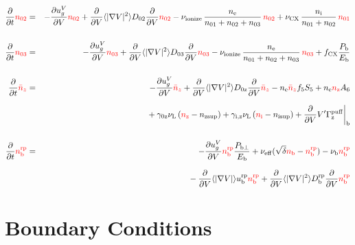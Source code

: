 \documentclass[11pt]{article}
\def\r#1{{\rm#1}}
\def\aves#1{\langle#1\rangle}
\def\dd#1#2{\frac{\partial #1}{\partial #2}}
\def\ddV{\frac{\partial}{\partial V}}
\def\ddt{\frac{\partial}{\partial t}}
\def\nee{n_\r{e}}
\def\ni{n_\r{i}}
\def\nz{n_\r{z}}
\def\nb{n_\r{b}}
\def\ugV{u_{g}^V}
\def\nsup#1{n_\r{#1sup}}
\def\nbrp{n_\r{b}^\r{rp}}
\def\ubrp{u_\r{b}^\r{rp}}
\def\Dbrp{D_\r{b}^\r{rp}}
\def\Pbperp{P_{\r{b}\perp}}
\def\Pb{P_\r{b}}
\def\Eb{E_\r{b}}
\def\nna{n_{01}}
\def\nnb{n_{02}}
\def\nnc{n_{03}}
\def\nnz{\bar{n}_{z}}
\def\nueff{\nu_\r{eff}}
\def\fCX{f_\r{CX}}
\def\nuL{\nu_\r{L}}
\def\nuCX{\nu_\r{CX}}
\def\nuion{\nu_\r{ionize}}
\def\nub{\nu_\r{b}}
\def\red#1{\textcolor{red}{#1}}
\begin{document}
\begin{eqnarray}
  \ddt \red{\nnb} &=& 
%
  - \dd{\ugV}{V} \red{\nnb}
%
  + \ddV \aves{|\nabla V|^2} D_{02} \ddV \red{\nnb}
%
  - \nuion\, \frac{\nee}{\nna + \nnb + \nnc}\, \red{\nnb}
%
  + \nuCX\, \frac{\ni}{\nna + \nnb}\, \red{\nna}
%
\\[5mm]
  \ddt \red{\nnc} &=& 
%
  - \dd{\ugV}{V} \red{\nnc}
%
  + \ddV \aves{|\nabla V|^2} D_{03} \ddV \red{\nnc}
%
  - \nuion\, \frac{\nee}{\nna + \nnb + \nnc}\, \red{\nnc}
%
  + \fCX \frac{\Pb}{\Eb}
\\[5mm]
  \ddt \red{\nnz} &=& 
%
  - \dd{\ugV}{V} \red{\nnz}
%
  + \ddV \aves{|\nabla V|^2} D_{0\r{z}} \ddV \red{\nnz}
%
  - \nee \red{\nnz} f_5S_5 + \nee \red{\nz} A_6 
\nonumber\\[2.5mm]&&{}
%
  + \gamma_\r{0z} \nuL \, (\red{\nz} - \nsup{z})
%
  + \gamma_\r{i,z} \nuL \, (\red{\ni} - \nsup{i})
%
  + \ddV V' \Gamma^\r{puff}_\r{z}\biggr|_\r{b}
\\[5mm]
  \ddt \red{\nbrp} &=&
%
  - \dd{\ugV}{V} \red{\nbrp}
%
    \frac{\Pbperp}{\Eb}
%
  + \nueff (\sqrt{\delta} \red{\nb} - \red{\nbrp})
%
  - \nub \red{\nbrp}
%
\nonumber\\[2.5mm]&&{}
  - \ddV \aves{|\nabla V|} \ubrp \red{\nbrp} 
  + \ddV \aves{|\nabla V|^2} \Dbrp \ddV \red{\nbrp}
\end{eqnarray}

\bigskip

\section{Boundary Conditions}
\end{document}
